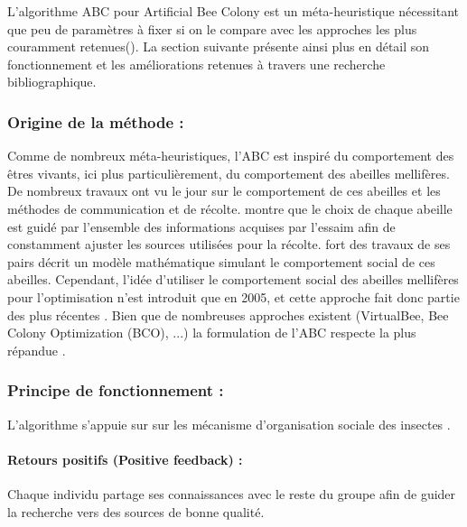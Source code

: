 L’algorithme ABC pour Artificial Bee Colony est un méta-heuristique nécessitant
que peu de paramètres à fixer si on le compare avec les approches les plus
couramment retenues().
La section suivante présente ainsi plus en détail son fonctionnement et les améliorations
retenues à travers une recherche bibliographique.



\subsubsection{Origine de la méthode :} %
\label{ssub:origine_de_la_méthode}
Comme de nombreux méta-heuristiques, l’ABC est inspiré du comportement des êtres
vivants, ici plus particulièrement, du comportement des abeilles mellifères. De nombreux
travaux ont vu le jour sur le comportement de ces abeilles et les méthodes de
communication et de récolte. \cite{Visscher19821790} montre que le choix de chaque abeille
est guidé par l’ensemble des informations acquises par l’essaim afin de constamment
ajuster les sources utilisées pour la récolte.
\cite{Camazine1991547} fort des travaux de ses pairs décrit un modèle mathématique
simulant le comportement social de ces abeilles.
Cependant, l’idée d’utiliser le comportement social des abeilles mellifères pour l’optimisation
n’est introduit que en 2005, et cette approche fait donc partie des plus récentes \parencite{Karaboga2005}.
Bien que de nombreuses approches existent (VirtualBee, Bee Colony Optimization (BCO), ...)
la formulation de l’ABC respecte la plus répandue \parencite{Karaboga201221}.


\subsubsection{Principe de fonctionnement :} %
\label{ssub:principe_de_fonctionnement}
L’algorithme s’appuie sur sur les mécanisme d’organisation sociale des insectes \parencite{Bonabeau1999}.
\paragraph{Retours positifs (Positive feedback) :} %
\label{par:positive_feedback}
Chaque individu partage ses connaissances avec le reste du groupe afin de guider
la recherche vers des sources de bonne qualité.

